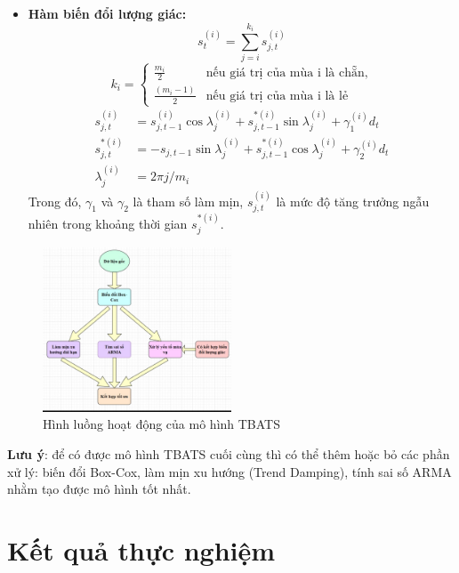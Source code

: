 \documentclass[conference]{IEEEtran}
\begin{document}
\begin{itemize}
    \item \textbf{Hàm biến đổi lượng giác:}
    \[
    s_t^{(i)} = \sum_{j=i}^{k_i} s_{j,t}^{(i)}
    \]
    \[
    k_i = 
    \begin{cases} 
    \frac{m_i}{2} & \text{nếu giá trị của mùa i là chẵn,} \\
    \frac{(m_i - 1)}{2} & \text{nếu giá trị của mùa i là lẻ}
    \end{cases}
    \]
    \begin{align*}
    s_{j,t}^{(i)} &= s_{j,t-1}^{(i)} \cos \lambda_j^{(i)} + s_{j,t-1}^{*(i)} \sin \lambda_j^{(i)} + \gamma_1^{(i)} d_t \\
    s_{j,t}^{*(i)} &= -s_{j,t-1} \sin \lambda_j^{(i)} + s_{j,t-1}^{*(i)} \cos \lambda_j^{(i)} + \gamma_2^{(i)} d_t \\
    \lambda_j^{(i)} &= 2\pi j / m_i
    \end{align*}
Trong đó, \( \gamma_1 \) và \( \gamma_2 \) là tham số làm mịn, \( s_{j,t}^{(i)} \) là mức độ tăng trưởng ngẫu nhiên trong khoảng thời gian \( s_j^{*(i)} \).


\end{itemize}





\begin{figure}[H]
    \centering
    \includegraphics[width=0.5\textwidth]{bibliography/Figure/tbats.png}
    \caption{Hình luồng hoạt động của mô hình TBATS}
    \label{fig:tbats_workflow}
\end{figure}

\textbf{Lưu ý}: để có được mô hình TBATS cuối cùng thì có thể thêm hoặc bỏ các phần xử lý: biến đổi Box-Cox, làm mịn xu hướng (Trend Damping), tính sai số ARMA nhằm tạo được mô hình tốt nhất.

\section{Kết quả thực nghiệm}
\end{document}
